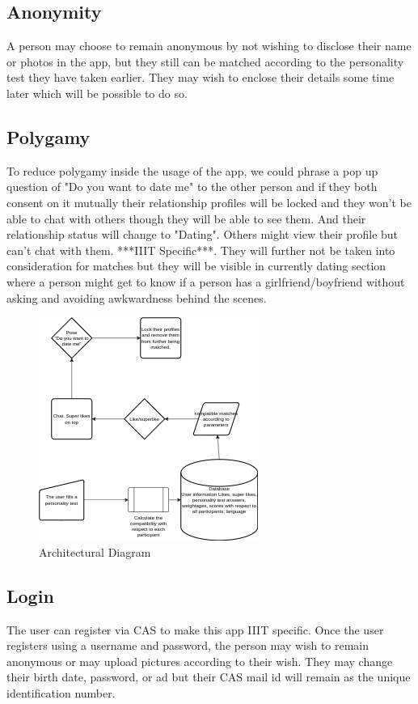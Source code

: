 \documentclass[conference]{IEEEtran}
\begin{document}
\subsection{Anonymity}
A person may choose to remain anonymous by not wishing to disclose their name or photos in the app, but they still can be matched according to the personality test they have taken earlier. They may wish to enclose their details some time later which will be possible to do so.

\subsection{Polygamy}
To reduce polygamy inside the usage of the app, we could phrase a pop up question of "Do you want to date me" to the other person and if they both consent on it mutually their relationship profiles will be locked and they won't be able to chat with others though they will be able to see them. And their relationship status will change to "Dating". Others might view their profile but can't chat with them. ***IIIT Specific***. They will further not be taken into consideration for matches but they will be visible in currently dating section where a person might get to know if a person has a girlfriend/boyfriend without asking and avoiding awkwardness behind the scenes.

\begin{figure}[htbp]
\centerline{\includegraphics{dass_1.drawio (1).png}}
\caption{Architectural Diagram}
\label{fig}
\end{figure}

\subsection{Login}
The user can register via CAS to make this app IIIT specific. Once the user registers using a username and password, the person may wish to remain anonymous or may upload pictures according to their wish. They may change their birth date, password, or ad but their CAS mail id will remain as the unique identification number.
\end{document}
